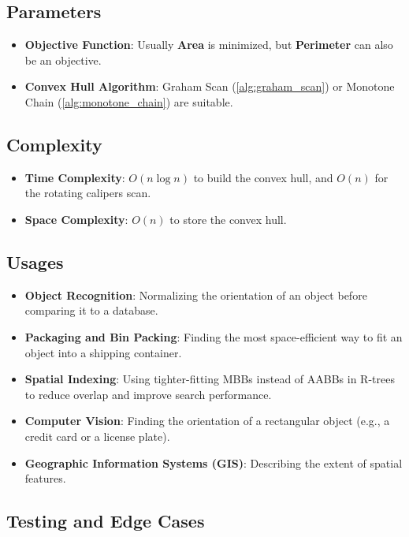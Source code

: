 \subsection{Parameters}

\begin{itemize}
\item \textbf{Objective Function}: Usually \textbf{Area} is minimized, but \textbf{Perimeter} can also be an objective.
\item \textbf{Convex Hull Algorithm}: Graham Scan (\cref{alg:graham_scan}) or Monotone Chain (\cref{alg:monotone_chain}) are suitable.
\end{itemize}

\subsection{Complexity}

\begin{itemize}
\item \textbf{Time Complexity}: $O(n \log n)$ to build the convex hull, and $O(n)$ for the rotating calipers scan.
\item \textbf{Space Complexity}: $O(n)$ to store the convex hull.
\end{itemize}

\subsection{Usages}

\begin{itemize}
\item \textbf{Object Recognition}: Normalizing the orientation of an object before comparing it to a database.
\item \textbf{Packaging and Bin Packing}: Finding the most space-efficient way to fit an object into a shipping container.
\item \textbf{Spatial Indexing}: Using tighter-fitting MBBs instead of AABBs in R-trees to reduce overlap and improve search performance.
\item \textbf{Computer Vision}: Finding the orientation of a rectangular object (e.g., a credit card or a license plate).
\item \textbf{Geographic Information Systems (GIS)}: Describing the extent of spatial features.
\end{itemize}

\subsection{Testing and Edge Cases}

